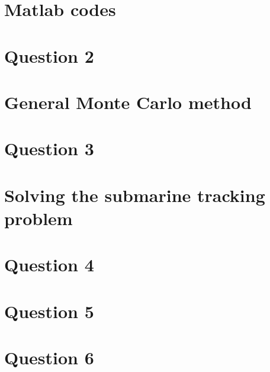 \documentclass[english,DIV=13]{scrartcl}
\begin{document}
\newpage
\section{Matlab codes}
\label{codes}
\appendix
\section*{Question 2}



\section*{General Monte Carlo method}

\section*{Question 3}


\section*{Solving the submarine tracking problem}

\section*{Question 4}

\section*{Question 5}


\section*{Question 6}
\end{document}
